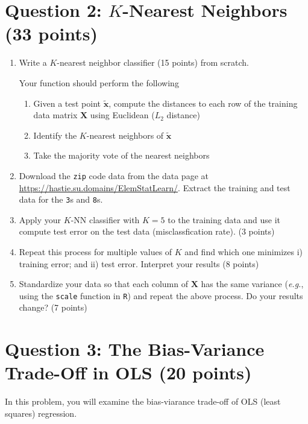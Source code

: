 \documentclass[10pt]{article}
\newcommand{\bx}{\bm{x}}
\newcommand{\bX}{\bm{X}}
\begin{document}
\section*{Question 2:  $K$-Nearest Neighbors (33 points)}
\begin{enumerate}[label={(\alph*)}]
\item Write a $K$-nearest neighbor classifier (15 points) from scratch. 

Your function should perform the following
\begin{enumerate}
    \item Given a test point $\tilde{\bx}$, compute the distances to each row of the training data matrix $\bX$ using Euclidean ($L_2$ distance)
    \item Identify the $K$-nearest neighbors of $\tilde{\bx}$
    \item Take the majority vote of the nearest neighbors
\end{enumerate}
\item Download the \texttt{zip} code data from the data page at \url{https://hastie.su.domains/ElemStatLearn/}. Extract the training and test data for the \texttt{3}s and \texttt{8}s. 
\item Apply your $K$-NN classifier with $K=5$ to the training data and use it compute test error on the test data (misclassfication rate). (3 points)
\item Repeat this process for multiple values of $K$ and find which one minimizes i) training error; and ii) test error. Interpret your results (8 points)
\item Standardize your data so that each column of $\bX$ has the same variance (\emph{e.g.}, using the \texttt{scale} function in \texttt{R}) and repeat the above process. Do your results change?  (7 points)
\end{enumerate}


\section*{Question 3: The Bias-Variance Trade-Off in OLS (20 points)}

In this problem, you will examine the bias-viarance trade-off of OLS (least squares) regression. 
\end{document}
